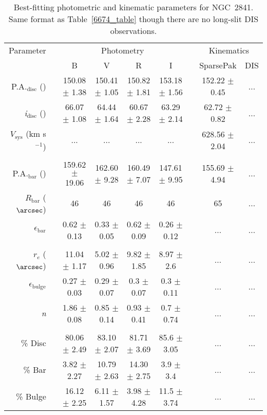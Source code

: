 \documentclass[a4paper,fleqn,usenatbib]{mnras}
\begin{document}
\begin{table*}
	\centering
	\caption{Best-fitting photometric and kinematic parameters for NGC~2841. Same format as Table~\ref{6674_table} though there are no long-slit DIS observations.}
	\label{2841_table}
	\begin{tabular}{rcccccccc}
		\hline
		Parameter		&		&\multicolumn{4}{c}{Photometry}		&		&\multicolumn{2}{c}{Kinematics}\\
							\cline{3-6}									\cline{8-9}
					&		&B		&V		&R		&I		&		&SparsePak		&DIS\\
		\hline
	P.A.$_{\mathrm{disc}}$ (\degr) & & 150.08 $\pm$ 1.38 & 150.41 $\pm$ 1.05 & 150.82 $\pm$ 1.81 & 153.18 $\pm$ 1.56 & & 152.22 $\pm$ 0.45 & ... \\
	\textit{i}$_{\mathrm{disc}}$ (\degr) & & 66.07 $\pm$ 1.08 & 64.44 $\pm$ 1.64 & 60.67 $\pm$ 2.28 & 63.29 $\pm$ 2.14 & & 62.72 $\pm$ 0.82 & ... \\
	$V_{\mathrm{sys}}$ (km s$^{-1}$) & & ... & ... & ... & ... & & 628.56 $\pm$ 2.04 & ... \\
	\\
	P.A.$_{\mathrm{bar}}$ (\degr) & & 159.62 $\pm$ 19.06 & 162.60 $\pm$ 9.28 & 160.49 $\pm$ 7.07 & 147.61 $\pm$ 9.95 & & 155.69 $\pm$ 4.94 & ... \\
	$R_{\mathrm{bar}}$ ($\arcsec$) & & 46 & 46 & 46 & 46 & & 65 & ... \\
	$\epsilon_{\mathrm{bar}}$ & & 0.62 $\pm$ 0.13 & 0.33 $\pm$ 0.05 & 0.62 $\pm$ 0.09 & 0.26 $\pm$ 0.12 & & ... & ... \\
	\\
	$r_{e}$ ($\arcsec$) & & 11.04 $\pm$ 1.17 & 5.02 $\pm$ 0.96 & 9.82 $\pm$ 1.85 & 8.97 $\pm$ 2.6 & & ... & ... \\
	$\epsilon_{\mathrm{bulge}}$ & & 0.27 $\pm$ 0.03 & 0.29 $\pm$ 0.07 & 0.3 $\pm$ 0.07 & 0.3 $\pm$ 0.11 & & ... & ... \\
	\textit{n} & & 1.86 $\pm$ 0.08 & 0.85 $\pm$ 0.14 & 0.93 $\pm$ 0.41 & 0.7 $\pm$ 0.74 & & ... & ... \\
	\\
	\% Disc & & 80.06 $\pm$ 2.49 & 83.10 $\pm$ 2.07 & 81.71 $\pm$ 3.69 & 85.6 $\pm$ 3.05 & & ... & ... \\
	\% Bar & & 3.82 $\pm$ 2.27 & 10.79 $\pm$ 2.63 & 14.30 $\pm$ 2.75 & 3.9 $\pm$ 3.4 & & ... & ... \\
	\% Bulge & & 16.12 $\pm$ 2.25 & 6.11 $\pm$ 1.57 & 3.98 $\pm$ 4.28 & 11.5 $\pm$ 3.74 & & ... & ... \\
	\hline
	\end{tabular}
\end{table*}
\end{document}
